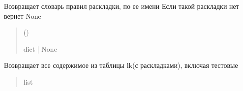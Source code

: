 \documentclass[a4paper,11pt,russian,openany,oneside]{sphinxmanual}
\begin{document}
\begin{savenotes}\begin{fulllineitems}
\label{\detokenize{database_module:database_module.database.take_lk_from_db}}
\pysigstartsignatures
\pysiglinewithargsret
{}
{}
{}
\pysigstopsignatures
\sphinxAtStartPar
Возвращает словарь правил раскладки, по ее имени
Если такой раскладки нет \sphinxhyphen{} вернет None
\begin{quote}\begin{description}
\sphinxAtStartPar
{} ()

\sphinxAtStartPar
dict | None

\end{description}\end{quote}

\end{fulllineitems}\end{savenotes}


\begin{savenotes}\begin{fulllineitems}
\label{\detokenize{database_module:database_module.database.take_all_data_from_lk}}
\pysigstartsignatures
\pysiglinewithargsret
{}
{}
{}
\pysigstopsignatures
\sphinxAtStartPar
Возвращает все содержимое из таблицы lk(с раскладками), включая тестовые
\begin{quote}\begin{description}
\sphinxAtStartPar
list

\end{description}\end{quote}

\end{fulllineitems}\end{savenotes}

\end{document}
